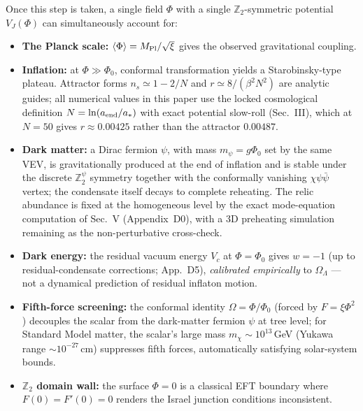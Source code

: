 \documentclass[pdflatex,sn-mathphys-num]{sn-jnl}
\newcommand{\MP}{M_{\rm Pl}}
\newcommand{\Ztwo}{\mathbb{Z}_2}
\newcommand{\Ztwopsi}{\Ztwo^{\psi}}
\newcommand{\PhiV}{\Phi_0}
\newcommand{\vev}[1]{\langle #1\rangle}
\theoremstyle{thmstyleone}
\begin{document}
Once this step is taken, a single field $\Phi$ with a single $\Ztwo$-symmetric potential $V_J(\Phi)$ can simultaneously account for:
\begin{itemize}
\item \textbf{The Planck scale:} $\vev{\Phi}=\MP/\sqrt{\xi}$ gives the observed gravitational coupling.
\item \textbf{Inflation:} at $\Phi\gg\PhiV$, conformal transformation yields a Starobinsky-type plateau. Attractor forms $n_s\simeq1-2/N$ and $r\simeq8/(\beta^2N^2)$ are analytic guides; all numerical values in this paper use the locked cosmological definition $N=\ln(a_{\rm end}/a_*)$ with exact potential slow-roll (Sec.~III), which at $N=50$ gives $r\approx0.00425$ rather than the attractor $0.00487$.
\item \textbf{Dark matter:} a Dirac fermion $\psi$, with mass $m_\psi=g\PhiV$ set by the same VEV, is gravitationally produced at the end of inflation and is stable under the discrete $\Ztwopsi$ symmetry together with the conformally vanishing $\chi\psi\bar\psi$ vertex; the condensate itself decays to complete reheating. The relic abundance is fixed at the homogeneous level by the exact mode-equation computation of Sec.~V (Appendix~D0), with a 3D preheating simulation remaining as the non-perturbative cross-check.
\item \textbf{Dark energy:} the residual vacuum energy $V_c$ at $\Phi=\PhiV$ gives $w=-1$ (up to residual-condensate corrections; App.~D5), \emph{calibrated empirically} to $\Omega_\Lambda$ --- not a dynamical prediction of residual inflaton motion.
\item \textbf{Fifth-force screening:} the conformal identity $\Omega=\Phi/\PhiV$ (forced by $F=\xi\Phi^2$) decouples the scalar from the dark-matter fermion $\psi$ at tree level; for Standard Model matter, the scalar's large mass $m_\chi\sim10^{13}\,$GeV (Yukawa range $\sim10^{-27}\,$cm) suppresses fifth forces, automatically satisfying solar-system bounds.
\item \textbf{$\Ztwo$ domain wall:} the surface $\Phi=0$ is a classical EFT boundary where $F(0)=F'(0)=0$ renders the Israel junction conditions inconsistent.
\end{itemize}
\end{document}
